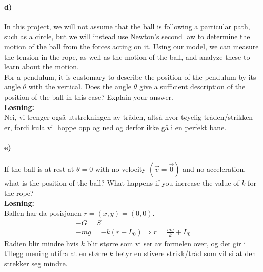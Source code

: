 \documentclass[11pt, A4paper,norsk]{article}
\begin{document}
		\paragraph{d)}
			\begin{flushleft}
In this project, we will not assume that the ball is following a particular path, such
as a circle, but we will instead use Newton’s second law to determine the motion of
the ball from the forces acting on it. Using our model, we can measure the tension
in the rope, as well as the motion of the ball, and analyze these to learn about the
motion. \\
For a pendulum, it is customary to describe the position of the pendulum by its
angle $\theta$ with the vertical. Does the angle $\theta$ give a sufficient description of the
position of the ball in this case? Explain your answer. \\
\vspace{1mm}
\textbf{Løsning:} \\
\vspace{1mm}
Nei, vi trenger også utstrekningen av tråden, altså hvor tøyelig tråden/strikken er, fordi kula vil hoppe opp og ned og derfor ikke gå i en perfekt bane.
			\end{flushleft}
		\paragraph{e)}
			\begin{flushleft}
If the ball is at rest at $\theta = 0$ with no velocity $(\vec{v} = \vec{0})$ and no acceleration, what is the position of the ball? What happens if you increase the value of $k$ for the rope? \\
\vspace{1mm}
\textbf{Løsning:} \\
\vspace{1mm}
Ballen har da posisjonen $r = (x, y) = (0, 0)$.
				\begin{align}
-G = S \\
-mg = -k(r - L_0) \Rightarrow r = \frac{mg}{k} + L_0
				\end{align}
Radien blir mindre hvis $k$ blir større som vi ser av formelen over, og det gir i tillegg mening utifra at en større $k$ betyr en stivere strikk/tråd som vil si at den strekker seg mindre.
			\end{flushleft}
\end{document}
